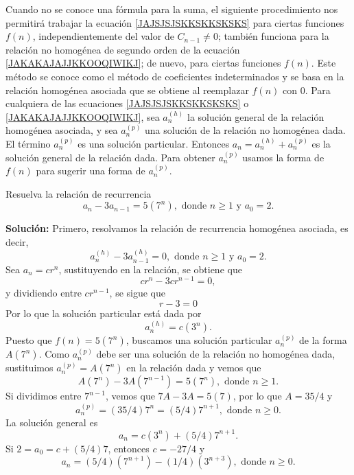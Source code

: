 \begin{BOX}
    Cuando no se conoce una fórmula para la suma, el siguiente procedimiento nos permitirá trabajar la ecuación \eqref{JAJSJSJSKKSKKSKSKS} para ciertas funciones $f(n)$, independientemente del valor de $C_{n-1} \neq 0$; también funciona para la relación no homogénea de segundo orden de la ecuación \eqref{JAKAKAJAJJKKOOQIWIKJ}; de nuevo, para ciertas funciones $f(n)$. Este método se conoce como el método de coeficientes indeterminados y se basa en la relación homogénea asociada que se obtiene al reemplazar $f(n)$ con 0. Para cualquiera de las ecuaciones \eqref{JAJSJSJSKKSKKSKSKS} o \eqref{JAKAKAJAJJKKOOQIWIKJ}, sea $a_n^{(h)}$ la solución general de la relación homogénea asociada, y sea $a_n^{(p)}$ una solución de la relación no homogénea dada. El término $a_n^{(p)}$ es una solución particular. Entonces $a_n=a_n^{(h)}+a_n^{(p)}$ es la solución general de la relación dada. Para obtener $a_n^{(p)}$ usamos la forma de $f(n)$ para sugerir una forma de $a_n^{(p)}$.
\end{BOX}

\newpage

\begin{myexample}
    Resuelva la relación de recurrencia
    $$a_n-3 a_{n-1}=5\left(7^n\right), \text{ donde } n \geq 1 \text{ y } a_0=2.$$

    \tcblower
    \textbf{\color{jblueleft}Solución:} Primero, resolvamos la relación de recurrencia homogénea asociada, es decir,
    $$a_n^{(h)} - 3a_{n-1}^{(h)} = 0, \text{ donde } n \geq 1 \text{ y } a_0 = 2.$$
    Sea $a_n = cr^n$, sustituyendo en la relación, se obtiene que
    $$cr^n - 3cr^{n-1} = 0,$$
    y dividiendo entre $cr^{n-1}$, se sigue que
    $$r-3 = 0$$
    Por lo que la solución particular está dada por
    $$a_n^{(h)}= c(3^n).$$
    Puesto que $f(n)=5\left(7^n\right)$, buscamos una solución particular $a_n^{(p)}$ de la forma $A\left(7^n\right)$. Como $a_n^{(p)}$ debe ser una solución de la relación no homogénea dada, sustituimos $a_n^{(p)}=A\left(7^n\right)$ en la relación dada y vemos que
    $$A\left(7^n\right)-3 A\left(7^{n-1}\right)=5\left(7^n\right), \text{ donde } n \geq 1.$$
    Si dividimos entre $7^{n-1}$, vemos que $7 A-3 A=5(7)$, por lo que $A=35 / 4$ y
    $$a_n^{(p)}=(35 / 4) 7^n=(5 / 4) 7^{n+1}, \text{ donde } n \geq 0.$$
    La solución general es
    $$a_n=c\left(3^n\right)+(5 / 4) 7^{n+1}.$$
    Si $2=a_0=c+(5 / 4) 7$, entonces $c=-27 / 4$ y
    $$a_n=(5 / 4)\left(7^{n+1}\right)-(1 / 4)\left(3^{n+3}\right), \text{ donde } n \geq 0.$$
\end{myexample}


